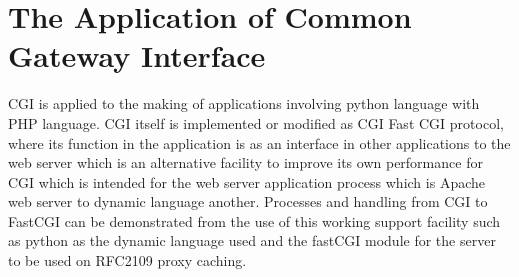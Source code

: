\section{The Application of Common Gateway Interface }
CGI is applied to the making of applications involving python language with PHP language. CGI itself is implemented or modified as CGI Fast CGI protocol, where its function in the application is as an interface in other applications to the web server which is an alternative facility to improve its own performance for CGI which is intended for the web server application process which is Apache web server to dynamic language another. Processes and handling from CGI to FastCGI can be demonstrated from the use of this working support facility such as python as the dynamic language used and the fastCGI module for the server to be used on RFC2109 proxy caching.